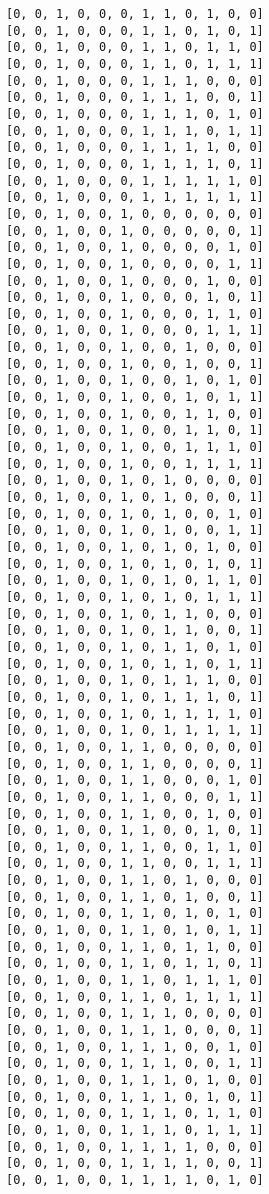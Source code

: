 \documentclass[11pt]{article}
\begin{document}
\begin{Verbatim}[commandchars=\\\{\}]
[0, 0, 1, 0, 0, 0, 1, 1, 0, 1, 0, 0]
[0, 0, 1, 0, 0, 0, 1, 1, 0, 1, 0, 1]
[0, 0, 1, 0, 0, 0, 1, 1, 0, 1, 1, 0]
[0, 0, 1, 0, 0, 0, 1, 1, 0, 1, 1, 1]
[0, 0, 1, 0, 0, 0, 1, 1, 1, 0, 0, 0]
[0, 0, 1, 0, 0, 0, 1, 1, 1, 0, 0, 1]
[0, 0, 1, 0, 0, 0, 1, 1, 1, 0, 1, 0]
[0, 0, 1, 0, 0, 0, 1, 1, 1, 0, 1, 1]
[0, 0, 1, 0, 0, 0, 1, 1, 1, 1, 0, 0]
[0, 0, 1, 0, 0, 0, 1, 1, 1, 1, 0, 1]
[0, 0, 1, 0, 0, 0, 1, 1, 1, 1, 1, 0]
[0, 0, 1, 0, 0, 0, 1, 1, 1, 1, 1, 1]
[0, 0, 1, 0, 0, 1, 0, 0, 0, 0, 0, 0]
[0, 0, 1, 0, 0, 1, 0, 0, 0, 0, 0, 1]
[0, 0, 1, 0, 0, 1, 0, 0, 0, 0, 1, 0]
[0, 0, 1, 0, 0, 1, 0, 0, 0, 0, 1, 1]
[0, 0, 1, 0, 0, 1, 0, 0, 0, 1, 0, 0]
[0, 0, 1, 0, 0, 1, 0, 0, 0, 1, 0, 1]
[0, 0, 1, 0, 0, 1, 0, 0, 0, 1, 1, 0]
[0, 0, 1, 0, 0, 1, 0, 0, 0, 1, 1, 1]
[0, 0, 1, 0, 0, 1, 0, 0, 1, 0, 0, 0]
[0, 0, 1, 0, 0, 1, 0, 0, 1, 0, 0, 1]
[0, 0, 1, 0, 0, 1, 0, 0, 1, 0, 1, 0]
[0, 0, 1, 0, 0, 1, 0, 0, 1, 0, 1, 1]
[0, 0, 1, 0, 0, 1, 0, 0, 1, 1, 0, 0]
[0, 0, 1, 0, 0, 1, 0, 0, 1, 1, 0, 1]
[0, 0, 1, 0, 0, 1, 0, 0, 1, 1, 1, 0]
[0, 0, 1, 0, 0, 1, 0, 0, 1, 1, 1, 1]
[0, 0, 1, 0, 0, 1, 0, 1, 0, 0, 0, 0]
[0, 0, 1, 0, 0, 1, 0, 1, 0, 0, 0, 1]
[0, 0, 1, 0, 0, 1, 0, 1, 0, 0, 1, 0]
[0, 0, 1, 0, 0, 1, 0, 1, 0, 0, 1, 1]
[0, 0, 1, 0, 0, 1, 0, 1, 0, 1, 0, 0]
[0, 0, 1, 0, 0, 1, 0, 1, 0, 1, 0, 1]
[0, 0, 1, 0, 0, 1, 0, 1, 0, 1, 1, 0]
[0, 0, 1, 0, 0, 1, 0, 1, 0, 1, 1, 1]
[0, 0, 1, 0, 0, 1, 0, 1, 1, 0, 0, 0]
[0, 0, 1, 0, 0, 1, 0, 1, 1, 0, 0, 1]
[0, 0, 1, 0, 0, 1, 0, 1, 1, 0, 1, 0]
[0, 0, 1, 0, 0, 1, 0, 1, 1, 0, 1, 1]
[0, 0, 1, 0, 0, 1, 0, 1, 1, 1, 0, 0]
[0, 0, 1, 0, 0, 1, 0, 1, 1, 1, 0, 1]
[0, 0, 1, 0, 0, 1, 0, 1, 1, 1, 1, 0]
[0, 0, 1, 0, 0, 1, 0, 1, 1, 1, 1, 1]
[0, 0, 1, 0, 0, 1, 1, 0, 0, 0, 0, 0]
[0, 0, 1, 0, 0, 1, 1, 0, 0, 0, 0, 1]
[0, 0, 1, 0, 0, 1, 1, 0, 0, 0, 1, 0]
[0, 0, 1, 0, 0, 1, 1, 0, 0, 0, 1, 1]
[0, 0, 1, 0, 0, 1, 1, 0, 0, 1, 0, 0]
[0, 0, 1, 0, 0, 1, 1, 0, 0, 1, 0, 1]
[0, 0, 1, 0, 0, 1, 1, 0, 0, 1, 1, 0]
[0, 0, 1, 0, 0, 1, 1, 0, 0, 1, 1, 1]
[0, 0, 1, 0, 0, 1, 1, 0, 1, 0, 0, 0]
[0, 0, 1, 0, 0, 1, 1, 0, 1, 0, 0, 1]
[0, 0, 1, 0, 0, 1, 1, 0, 1, 0, 1, 0]
[0, 0, 1, 0, 0, 1, 1, 0, 1, 0, 1, 1]
[0, 0, 1, 0, 0, 1, 1, 0, 1, 1, 0, 0]
[0, 0, 1, 0, 0, 1, 1, 0, 1, 1, 0, 1]
[0, 0, 1, 0, 0, 1, 1, 0, 1, 1, 1, 0]
[0, 0, 1, 0, 0, 1, 1, 0, 1, 1, 1, 1]
[0, 0, 1, 0, 0, 1, 1, 1, 0, 0, 0, 0]
[0, 0, 1, 0, 0, 1, 1, 1, 0, 0, 0, 1]
[0, 0, 1, 0, 0, 1, 1, 1, 0, 0, 1, 0]
[0, 0, 1, 0, 0, 1, 1, 1, 0, 0, 1, 1]
[0, 0, 1, 0, 0, 1, 1, 1, 0, 1, 0, 0]
[0, 0, 1, 0, 0, 1, 1, 1, 0, 1, 0, 1]
[0, 0, 1, 0, 0, 1, 1, 1, 0, 1, 1, 0]
[0, 0, 1, 0, 0, 1, 1, 1, 0, 1, 1, 1]
[0, 0, 1, 0, 0, 1, 1, 1, 1, 0, 0, 0]
[0, 0, 1, 0, 0, 1, 1, 1, 1, 0, 0, 1]
[0, 0, 1, 0, 0, 1, 1, 1, 1, 0, 1, 0]

\end{Verbatim}
\end{document}
